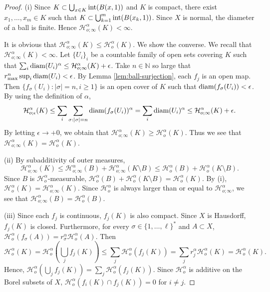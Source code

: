 \documentclass[a4paper, reqno, 11pt]{amsart}
\theoremstyle{definition}
\begin{document}
\begin{proof}
(i) Since $K \subset \bigcup_{x \in K} \textup{int}(B(x,1))$ and $K$ is compact, 
there exist $x_1, \dots, x_m \in K$ such that $K \subset \bigcup_{k=1}^{m} \textup{int}(B(x_k, 1))$. 
Since $X$ is normal, the diameter of a ball is finite. 
Hence $\mathcal{H}^{\alpha}_{o;\infty}(K) < \infty$. 

It is obvious that $\mathcal{H}^{\alpha}_{o;\infty}(K) \le \mathcal{H}^{\alpha}_{o}(K)$. 
We show the converse. 
We recall that $\mathcal{H}^{\alpha}_{o;\infty}(K) < \infty$. 
Let $\{U_i\}_i$ be a countable family of open sets covering $K$ such that $\sum_i \textup{diam}(U_i)^{\alpha} \le \mathcal{H}^{\alpha}_{o;\infty}(K) +\epsilon$.  
Take $n \in \mathbb{N}$ so large that $r_{\max}^n \sup_i \textup{diam}(U_i) < \epsilon$. 
By Lemma \ref{lem:ball-surjection}, each $f_j$ is an open map. 
Then $\{f_{\sigma}(U_i) \colon  |\sigma| = n, i \ge 1\}$ is an open cover of $K$ such that $\textup{diam}(f_{\sigma}(U_i)) < \epsilon$. 
By using the definition of $\alpha$, 
\[ \mathcal{H}_{o;\epsilon}^{\alpha}(K) \le \sum_{i} \sum_{\sigma : |\sigma| = n} \textup{diam}(f_{\sigma}(U_i))^{\alpha} =   \sum_{i} \textup{diam} (U_i)^{\alpha}  \le \mathcal{H}^{\alpha}_{o;\infty}(K) +\epsilon. \]
By letting $\epsilon \to +0$, we obtain that $\mathcal{H}^{\alpha}_{o;\infty}(K) \ge \mathcal{H}^{\alpha}_{o}(K)$. 
Thus we see that $\mathcal{H}^{\alpha}_{o;\infty}(K) = \mathcal{H}^{\alpha}_{o}(K)$. 


(ii) By subadditivity of outer measures, 
\[ \mathcal{H}^{\alpha}_{o;\infty}(K) \le \mathcal{H}^{\alpha}_{o;\infty}(B) + \mathcal{H}^{\alpha}_{o;\infty}(K \setminus B) \le  \mathcal{H}^{\alpha}_{o}(B) + \mathcal{H}^{\alpha}_{o}(K \setminus B). \]
Since $B$ is $ \mathcal{H}^{\alpha}_{o}$-measurable, 
$\mathcal{H}^{\alpha}_{o}(B) + \mathcal{H}^{\alpha}_{o}(K \setminus B) = \mathcal{H}^{\alpha}_{o}(K)$. 
By (i), $ \mathcal{H}^{\alpha}_{o}(K) =  \mathcal{H}^{\alpha}_{o;\infty}(K)$. 
Since $ \mathcal{H}^{\alpha}_{o}$ is always larger than or equal to $ \mathcal{H}^{\alpha}_{o;\infty}$, 
we see that $\mathcal{H}^{\alpha}_{o;\infty}(B) = \mathcal{H}^{\alpha}_{o}(B)$. 

(iii) Since each $f_j$ is continuous, $f_j (K)$ is also compact. 
Since $X$ is Hausdorff, $f_j (K)$ is closed. 
Furthermore, for every $\sigma \in \{1,\dots, \ell\}^{*}$ and $A \subset X$, 
$\mathcal{H}^{\alpha}_{o}(f_{\sigma}(A)) = r_{\sigma}^{\alpha} \mathcal{H}^{\alpha}_{o}(A)$. 
Then 
\[ \mathcal{H}^{\alpha}_{o}(K) =  \mathcal{H}^{\alpha}_{o} \left(\bigcup_{j} f_j(K) \right)  \le \sum_{j}  \mathcal{H}^{\alpha}_{o}(f_j(K)) = \sum_j r_j^{\alpha}  \mathcal{H}^{\alpha}_{o}(K) =  \mathcal{H}^{\alpha}_{o}(K).   \]
Hence, $ \mathcal{H}^{\alpha}_{o} \left(\bigcup_{j} f_j(K) \right) = \sum_{j}  \mathcal{H}^{\alpha}_{o}(f_j(K))$. 
Since $ \mathcal{H}^{\alpha}_{o}$ is additive on the Borel subsets of $X$, 
$\mathcal{H}^{\alpha}_{o}(f_{i}(K) \cap f_{j}(K)) = 0$ for $i \ne j$. 


\end{proof}
\end{document}
